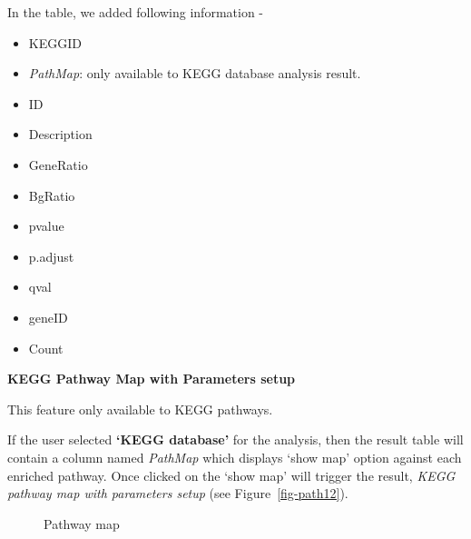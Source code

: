 \documentclass[
  a4paper,
  DIV=11,
  numbers=noendperiod,
  oneside,
  open=any]{scrreport}
\providecommand{\tightlist}{%
  \setlength{\itemsep}{0pt}\setlength{\parskip}{0pt}}\usepackage{longtable,booktabs,array}
\begin{document}
In the table, we added following information -

\begin{itemize}
\tightlist
\item
  KEGGID
\item
  \emph{PathMap}: only available to KEGG database analysis result.
\item
  ID
\item
  Description
\item
  GeneRatio
\item
  BgRatio
\item
  pvalue
\item
  p.adjust
\item
  qval
\item
  geneID
\item
  Count
\end{itemize}

\textbf{KEGG Pathway Map with Parameters setup}

\begin{tcolorbox}[enhanced jigsaw, coltitle=black, colback=white, title=\textcolor{quarto-callout-important-color}{\faExclamation}\hspace{0.5em}{Important}, leftrule=.75mm, titlerule=0mm, colframe=quarto-callout-important-color-frame, toprule=.15mm, opacityback=0, arc=.35mm, breakable, rightrule=.15mm, colbacktitle=quarto-callout-important-color!10!white, bottomtitle=1mm, opacitybacktitle=0.6, left=2mm, bottomrule=.15mm, toptitle=1mm]

This feature only available to KEGG pathways.

\end{tcolorbox}

If the user selected \textbf{`KEGG database'} for the analysis, then the
result table will contain a column named \emph{PathMap} which displays
`show map' option against each enriched pathway. Once clicked on the
`show map' will trigger the result, \emph{KEGG pathway map with
parameters setup} (see Figure~\ref{fig-path12}).

\begin{figure}[H]


\caption{\label{fig-path3}Pathway map}

\end{figure}%
\end{document}
